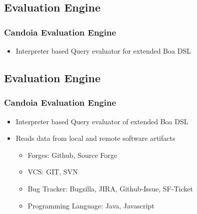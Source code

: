    \subsection{Evaluation Engine}
        \begin{frame}
            \frametitle{Candoia Evaluation Engine}
            \begin{itemize}
                \item Interpreter based Query evaluator for extended Boa DSL
            \end{itemize}
        \end{frame}

    \subsection{Evaluation Engine}
        \begin{frame}
            \frametitle{Candoia Evaluation Engine}
            \begin{itemize}
                \item Interpreter based Query evaluator of extended Boa DSL
                \item Reads data from local and remote software artifacts
                    \begin{itemize}
                        \item Forges: Github, Source Forge
                        \item VCS: GIT, SVN
                        \item Bug Tracker: Bugzilla, JIRA, Github-Issue, SF-Ticket
                        \item Programming Language: Java, Javascript
                    \end{itemize}
                \end{itemize}
            \end{frame}


